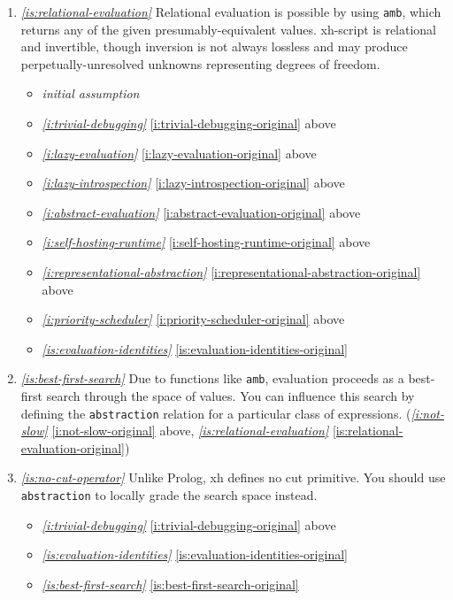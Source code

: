 \documentclass{report}
\makeatletter
\newcommand*{\Label}[2]{%
  \@bsphack
  \begingroup
    \label{#1-original}%
    \def\@currentlabel{#2}%
    \label{#1}%
  \endgroup
  \@esphack
}
\newcommand{\initial}{{\em initial assumption}}
\newcommand{\refboth}[1]{{\em \ref{#1}} \ref{#1-original}}
\makeatother
\begin{document}
\begin{enumerate}
\item{}\Label{is:relational-evaluation}{xhs.relational}{\em\ref{is:relational-evaluation}}
  Relational evaluation is possible by using {\tt amb}, which returns any
  of the given presumably-equivalent values. xh-script is relational and
  invertible, though inversion is not always lossless and may produce
  perpetually-unresolved unknowns representing degrees of freedom.
\begin{itemize}
\item \initial
\item \refboth{i:trivial-debugging} above
\item \refboth{i:lazy-evaluation} above
\item \refboth{i:lazy-introspection} above
\item \refboth{i:abstract-evaluation} above
\item \refboth{i:self-hosting-runtime} above
\item \refboth{i:representational-abstraction} above
\item \refboth{i:priority-scheduler} above
\item \refboth{is:evaluation-identities}
\end{itemize}
\item{}\Label{is:best-first-search}{xhs.bestfirst}{\em\ref{is:best-first-search}}
  Due to functions like {\tt amb}, evaluation proceeds as a best-first
  search through the space of values. You can influence this search by
  defining the {\tt abstraction} relation for a particular class of
  expressions.
(\refboth{i:not-slow} above, \refboth{is:relational-evaluation})
\item{}\Label{is:no-cut-operator}{xhs.nocut}{\em\ref{is:no-cut-operator}}
  Unlike Prolog, xh defines no cut primitive. You should use {\tt
  abstraction} to locally grade the search space instead.
\begin{itemize}
\item \refboth{i:trivial-debugging} above
\item \refboth{is:evaluation-identities}
\item \refboth{is:best-first-search}
\end{itemize}


\end{enumerate}
\end{document}
